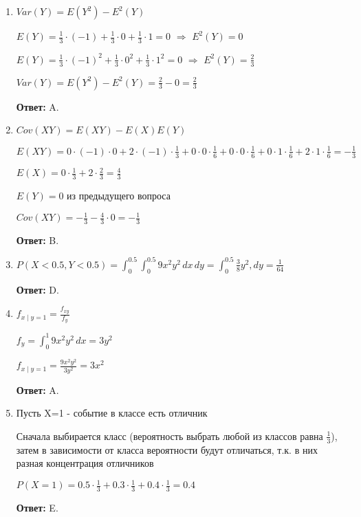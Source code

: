 \documentclass[a4paper]{article} %
\begin{document}
\begin{enumerate}
    
    \item
    $Var(Y) = E(Y^2) - E^2(Y)$
    
    $E(Y) = \frac{1}{3} \cdot (-1) + \frac{1}{3} \cdot 0 + \frac{1}{3} \cdot 1 = 0$ $\Rightarrow$ $E^2(Y)=0$
    
    $E(Y) = \frac{1}{3} \cdot (-1)^2 + \frac{1}{3} \cdot 0^2 + \frac{1}{3} \cdot 1^2 = 0$ $\Rightarrow$ $E^2(Y)= \frac{2}{3}$
    
    $Var(Y) = E(Y^2) - E^2(Y) = \frac{2}{3} - 0 = \frac{2}{3}$
    
    \textbf{Ответ:} A.
    
    \item
    $Cov(XY) = E(XY) - E(X)E(Y)$
    
    $E(XY) = 0\cdot(-1)\cdot0 + 2\cdot(-1)\cdot\frac{1}{3} + 0\cdot0\cdot\frac{1}{6} + 0\cdot0\cdot\frac{1}{6} + 0\cdot1\cdot\frac{1}{6} + 2\cdot1\cdot\frac{1}{6} = -\frac{1}{3}$
    
    $E(X) = 0\cdot\frac{1}{3} + 2\cdot\frac{2}{3} = \frac{4}{3}$
    
    $E(Y) =0 $ из предыдущего вопроса
    
    $Cov(XY) = -\frac{1}{3} - \frac{4}{3}\cdot0 = -\frac{1}{3}$
    
    \textbf{Ответ:} B.
    
    \item
    $P(X<0.5, Y<0.5) = \int_{0}^{0.5}\int_{0}^{0.5} 9x^2y^2 \,dx\,dy = \int_{0}^{0.5} \frac{3}{8}y^2 ,dy = \frac{1}{64}$
    
    \textbf{Ответ:} D.
    
    
    \item
    $f_{x\mid y=1} = \frac{f_{xy}}{f_{y}} $
    
    $f_{y} = \int_{0}^{1} 9x^2y^2 \,dx = 3y^2$
    
    $f_{x\mid y=1} = \frac{9x^2y^2}{3y^2} = 3x^2$
    
    \textbf{Ответ:} A.
    
    \item
    Пусть X=1 - событие в классе есть отличник
    
    Сначала выбирается класс (вероятность выбрать любой из классов равна $\frac{1}{3}$), затем в зависимости от класса вероятности будут отличаться, т.к. в них разная концентрация отличников
    
    $P(X=1) = 0.5\cdot\frac{1}{3} + 0.3\cdot\frac{1}{3} + 0.4\cdot\frac{1}{3} = 0.4$
    
    \textbf{Ответ:} E.
    

\end{enumerate}
\end{document}
